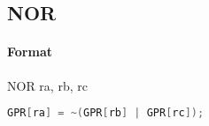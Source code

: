 \subsection{NOR}


\paragraph{Format} NOR ra, rb, rc

\begin{lstlisting}[language=C]
    GPR[ra] = ~(GPR[rb] | GPR[rc]);
\end{lstlisting}